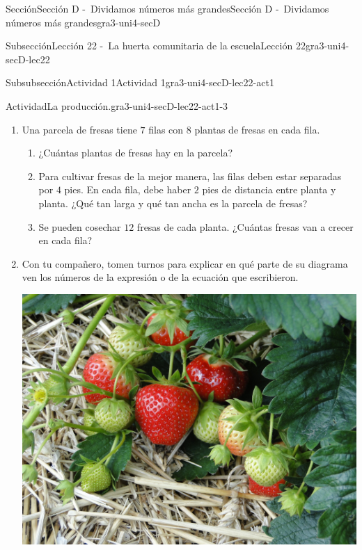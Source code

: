 \documentclass[twoside,10pt,]{article}
\begin{document}
\begin{sectionptx}{Sección}{Sección D -~Dividamos números más grandes}{}{Sección D -~Dividamos números más grandes}{}{}{gra3-uni4-secD}
\begin{subsectionptx}{Subsección}{Lección 22 -~La huerta comunitaria de la escuela}{}{Lección 22}{}{}{gra3-uni4-secD-lec22}
\begin{subsubsectionptx}{Subsubsección}{Actividad 1}{}{Actividad 1}{}{}{gra3-uni4-secD-lec22-act1}
\begin{activity}{Actividad}{La producción.}{gra3-uni4-secD-lec22-act1-3}
%
\begin{enumerate}
\item{}Una parcela de fresas tiene \(7\) filas con \(8\) plantas de fresas en cada fila.%
%
\begin{enumerate}
\item{}¿Cuántas plantas de fresas hay en la parcela?%
\item{}Para cultivar fresas de la mejor manera, las filas deben estar separadas por \(4\) pies. En cada fila, debe haber \(2\) pies de distancia entre planta y planta. ¿Qué tan larga y qué tan ancha es la parcela de fresas?%
\item{}Se pueden cosechar \(12\) fresas de cada planta. ¿Cuántas fresas van a crecer en cada fila?%
\end{enumerate}
\item{}\begin{sidebyside}{2}{0}{0}{0.1}%
\begin{sbspanel}{0.6}%
Con tu compañero, tomen turnos para explicar en qué parte de su diagrama ven los números de la expresión o de la ecuación que escribieron.%
\end{sbspanel}%
\begin{sbspanel}{0.3}%
\includegraphics[width=\linewidth]{external/jpg-source/3-4-D-22 Act1-Fresas.jpg}
\end{sbspanel}%
\end{sidebyside}%
%
\end{enumerate}
\end{activity}%
\end{subsubsectionptx}
%
%
\typeout{************************************************}

\end{subsectionptx}
\end{sectionptx}
\end{document}
